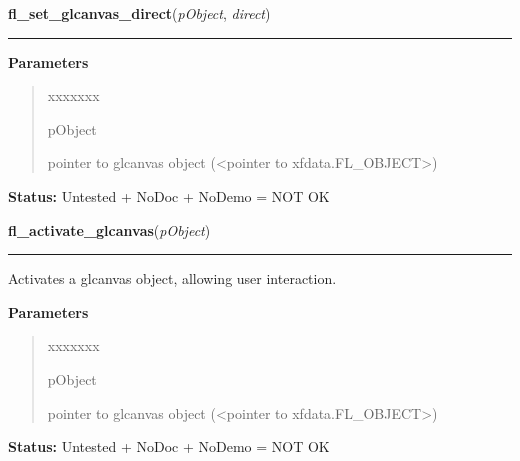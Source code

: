 \hspace{.8\funcindent}\begin{boxedminipage}{\funcwidth}

    \raggedright \textbf{fl\_set\_glcanvas\_direct}(\textit{pObject}, \textit{direct})

    \vspace{-1.5ex}

    \rule{\textwidth}{0.5\fboxrule}
\setlength{\parskip}{2ex}
\setlength{\parskip}{1ex}
      \textbf{Parameters}
      \vspace{-1ex}

      \begin{quote}
        \begin{Ventry}{xxxxxxx}

          \item[pObject]

          pointer to glcanvas object ({\textless}pointer to 
          xfdata.FL\_OBJECT{\textgreater})

        \end{Ventry}

      \end{quote}

\textbf{Status:} Untested + NoDoc + NoDemo = NOT OK



    \end{boxedminipage}

    \label{xformslib:library:fl_activate_glcanvas}

    \vspace{0.5ex}

\hspace{.8\funcindent}\begin{boxedminipage}{\funcwidth}

    \raggedright \textbf{fl\_activate\_glcanvas}(\textit{pObject})

    \vspace{-1.5ex}

    \rule{\textwidth}{0.5\fboxrule}
\setlength{\parskip}{2ex}
    Activates a glcanvas object, allowing user interaction.

\setlength{\parskip}{1ex}
      \textbf{Parameters}
      \vspace{-1ex}

      \begin{quote}
        \begin{Ventry}{xxxxxxx}

          \item[pObject]

          pointer to glcanvas object ({\textless}pointer to 
          xfdata.FL\_OBJECT{\textgreater})

        \end{Ventry}

      \end{quote}

\textbf{Status:} Untested + NoDoc + NoDemo = NOT OK



    \end{boxedminipage}

